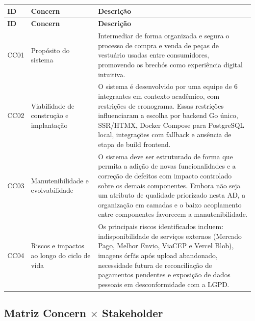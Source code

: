 \documentclass[12pt, a4paper]{article}
\begin{document}
\begin{longtable}{|p{1.2cm}|p{4.5cm}|p{8.8cm}|}
\hline
\textbf{ID} & \textbf{Concern} & \textbf{Descrição} \\
\hline
\endfirsthead
\hline
\textbf{ID} & \textbf{Concern} & \textbf{Descrição} \\
\hline
\endhead
CC01 & Propósito do sistema & Intermediar de forma organizada e segura o processo de compra e venda de peças de vestuário usadas entre consumidores, promovendo os brechós como experiência digital intuitiva. \\
\hline
CC02 & Viabilidade de construção e implantação & O sistema é desenvolvido por uma equipe de 6 integrantes em contexto acadêmico, com restrições de cronograma. Essas restrições influenciaram a escolha por backend Go único, SSR/HTMX, Docker Compose para PostgreSQL local, integrações com fallback e ausência de etapa de build frontend. \\
\hline
CC03 & Manutenibilidade e evolvabilidade & O sistema deve ser estruturado de forma que permita a adição de novas funcionalidades e a correção de defeitos com impacto controlado sobre os demais componentes. Embora não seja um atributo de qualidade priorizado nesta AD, a organização em camadas e o baixo acoplamento entre componentes favorecem a manutenibilidade. \\
\hline
CC04 & Riscos e impactos ao longo do ciclo de vida & Os principais riscos identificados incluem: indisponibilidade de serviços externos (Mercado Pago, Melhor Envio, ViaCEP e Vercel Blob), imagens órfãs após upload abandonado, necessidade futura de reconciliação de pagamentos pendentes e exposição de dados pessoais em desconformidade com a LGPD. \\
\hline
\end{longtable}

\subsection{Matriz Concern $\times$ Stakeholder}
\end{document}
